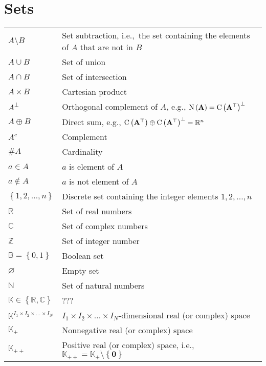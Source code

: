 \documentclass{article}
\let\emptyset\varnothing
\newcommand{\nullspace}[1]{\ensuremath{\textnormal{N}\left(#1\right)}} %
\newcommand{\range}[1]{\ensuremath{\textnormal{C}\left(#1\right)}} %
\begin{document}
\section{Sets}
\begin{xltabular}{\textwidth}{XX}
    \(A \setminus B\) & Set subtraction, i.e., the set containing the elements of \(A\) that are not in \(B\)\\
    \(A \cup B\) & Set of union\\
    \(A \cap B\) & Set of intersection\\
    \(A \times B\) & Cartesian product\\
    \(A^{\perp}\) & Orthogonal complement of \(A\), e.g., \(\nullspace{\mathbf{A}} = \range{\mathbf{A}^{\top}}^{\perp}\)\\
    \(A \oplus B\) & Direct sum, e.g., \(\range{\mathbf{A}^{\top}} \oplus \range{\mathbf{A}^{\top}}^{\perp} = \mathbb{R}^{n}\)\\
    \(A^{c}\) & Complement\\
    \(\#A\) & Cardinality\\
    \(a \in A\)& \(a\) is element of \(A\) \\
    \(a \notin A\)& \(a\) is not element of \(A\) \\
    \(\left\{ 1,2, \dots, n \right\}\) & Discrete set containing the integer elements \(1,2, \dots, n\)\\
    \(\mathbb{R}\) & Set of real numbers\\
    \(\mathbb{C}\)& Set of complex numbers\\
    \(\mathbb{Z}\) & Set of integer number\\
    \(\mathbb{B} = \left\{ 0, 1 \right\}\) & Boolean set\\ %
    \(\emptyset\) & Empty set\\
    \(\mathbb{N}\) & Set of natural numbers\\
    \(\mathbb{K} \in \left\{ \mathbb{R}, \mathbb{C} \right\}\) & ???\\
    \(\mathbb{K}^{I_1\times I_2 \times \dots \times I_N}\) & \(I_1\times I_2 \times \dots \times I_N\)-dimensional real (or complex) space\\
    \(\mathbb{K}_{+}\) & Nonnegative real (or complex) space\\
    \(\mathbb{K}_{++}\) & Positive real (or complex) space, i.e., \(\mathbb{K}_{++} = \mathbb{K}_{+}\setminus\left\{ \mathbf{0} \right\}\)\\

\end{xltabular}
\end{document}
